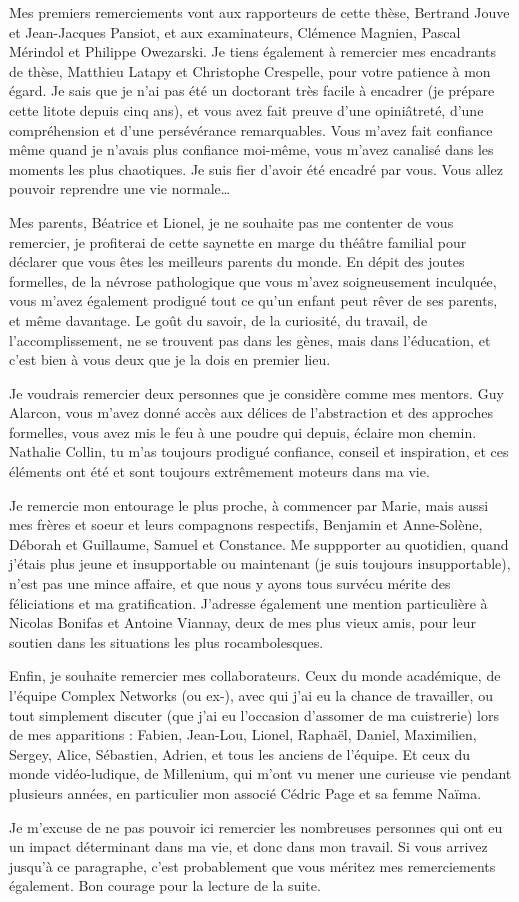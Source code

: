 
Mes premiers remerciements vont aux rapporteurs de cette thèse, Bertrand Jouve
et Jean-Jacques Pansiot, et aux examinateurs, Clémence Magnien, Pascal Mérindol
et Philippe Owezarski. Je tiens également à remercier mes encadrants de thèse,
Matthieu Latapy et Christophe Crespelle, pour votre patience à mon égard. Je
sais que je n'ai pas été un doctorant très facile à encadrer (je prépare cette
litote depuis cinq ans), et vous avez fait preuve d'une opiniâtreté, d'une
compréhension et d'une persévérance remarquables. Vous m'avez fait confiance
même quand je n'avais plus confiance moi-même, vous m'avez canalisé dans les moments
les plus chaotiques. Je suis fier d'avoir été encadré par vous. Vous allez
pouvoir reprendre une vie normale\ldots

Mes parents, Béatrice et Lionel, je ne souhaite pas me contenter de vous
remercier, je profiterai de cette saynette en marge du théâtre familial pour
déclarer que vous êtes les meilleurs parents du monde. En dépit des joutes
formelles, de la névrose pathologique que vous m'avez soigneusement inculquée,
vous m'avez également prodigué tout ce qu'un enfant peut rêver de ses parents,
et même davantage. Le goût du savoir, de la curiosité, du travail, de
l'accomplissement, ne se trouvent pas dans les gènes, mais dans l'éducation, et
c'est bien à vous deux que je la dois en premier lieu.

Je voudrais remercier deux personnes que je considère comme mes mentors. Guy
Alarcon, vous m'avez donné accès aux délices de l'abstraction et des approches
formelles, vous avez mis le feu à une poudre qui depuis, éclaire mon chemin.
Nathalie Collin, tu m'as toujours prodigué confiance, conseil et inspiration,
et ces éléments ont été et sont toujours extrêmement moteurs dans ma vie.

Je remercie mon entourage le plus proche, à commencer par Marie, mais aussi mes
frères et soeur et leurs compagnons respectifs, Benjamin et Anne-Solène, Déborah
et Guillaume, Samuel et Constance. Me suppporter au quotidien, quand j'étais
plus jeune et insupportable ou maintenant (je suis toujours insupportable),
n'est pas une mince affaire, et que nous y ayons tous survécu mérite des
féliciations et ma gratification. J'adresse également une mention particulière à
Nicolas Bonifas et Antoine Viannay, deux de mes plus vieux amis, pour leur
soutien dans les situations les plus rocambolesques.

Enfin, je souhaite remercier mes collaborateurs. Ceux du monde académique, de
l'équipe Complex Networks (ou ex-), avec qui j'ai eu la chance de travailler, ou
tout simplement discuter (que j'ai eu l'occasion d'assomer de ma cuistrerie)
lors de mes apparitions : Fabien, Jean-Lou, Lionel, Raphaël, Daniel, Maximilien,
Sergey, Alice, Sébastien, Adrien, et tous les anciens de l'équipe. Et ceux du
monde vidéo-ludique, de Millenium, qui m'ont vu mener une curieuse vie pendant
plusieurs années, en particulier mon associé Cédric Page et sa femme Naïma.

Je m'excuse de ne pas pouvoir ici remercier les nombreuses personnes qui ont eu
un impact déterminant dans ma vie, et donc dans mon travail. Si vous arrivez
jusqu'à ce paragraphe, c'est probablement que vous méritez mes remerciements
également. Bon courage pour la lecture de la suite.
